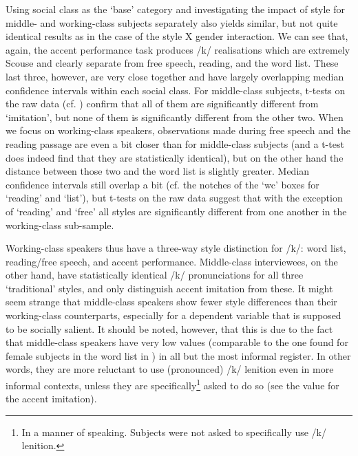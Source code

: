 Using social class as the `base' category and investigating the impact of style for middle- and working-class subjects separately also yields similar, but not quite identical results as in the case of the style X gender interaction.
We can see that, again, the accent performance task produces /k/ realisations which are extremely Scouse and clearly separate from free speech, reading, and the word list.
These last three, however, are very close together and have largely overlapping median confidence intervals within each social class.
For middle-class subjects, t-tests on the raw data (cf. ) confirm that all of them are significantly different from `imitation', but none of them is significantly different from the other two.
When we focus on working-class speakers, observations made during free speech and the reading passage are even a bit closer than for middle-class subjects (and a t-test does indeed find that they are statistically identical), but on the other hand the distance between those two and the word list is slightly greater.
Median confidence intervals still overlap a bit (cf. the notches of the `wc' boxes for `reading' and `list'), but t-tests on the raw data suggest that with the exception of `reading' and `free' all styles are significantly different from one another in the working-class sub-sample.

Working-class speakers thus have a three-way style distinction for /k/: word list, reading/free speech, and accent performance.
Middle-class interviewees, on the other hand, have statistically identical /k/ pronunciations for all three `traditional' styles, and only distinguish accent imitation from these.
It might seem strange that middle-class speakers show fewer style differences than their working-class counterparts, especially for a dependent variable that is supposed to be socially salient.
It should be noted, however, that this is due to the fact that middle-class speakers have very low  values (comparable to the one found for female subjects in the word list in ) in all but the most informal register.
In other words, they are more reluctant to use (pronounced) /k/ lenition even in more informal contexts, unless they are specifically\footnote{In a manner of speaking. Subjects were not asked to specifically use /k/ lenition.} asked to do so (see the value for the accent imitation).

